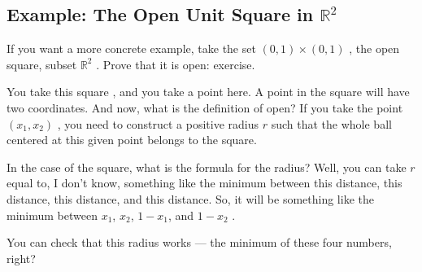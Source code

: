 \begin{hidden}
\end{hidden}

\subsection{Example: The Open Unit Square in \texorpdfstring{$\mathbb{R}^2$}{R2}}

\begin{speech}[00:07:12 - 00:08:35]
If you want a more concrete example, take the set $(0, 1) \times (0, 1)$ , the open square, subset $\mathbb{R}^2$ . Prove that it is open: exercise.

You take this square , and you take a point here. A point in the square will have two coordinates. And now, what is the definition of open? If you take the point $(x_1, x_2)$ , you need to construct a positive radius $r$ such that the whole ball centered at this given point belongs to the square.

In the case of the square, what is the formula for the radius? Well, you can take $r$ equal to, I don't know, something like the minimum between this distance, this distance, this distance, and this distance. So, it will be something like the minimum between $x_1$, $x_2$, $1 - x_1$, and $1 - x_2$ .

You can check that this radius works --- the minimum of these four numbers, right?
\end{speech}

